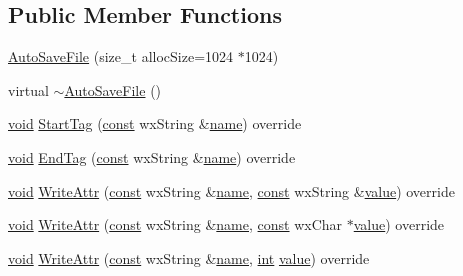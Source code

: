 \subsection*{Public Member Functions}
\begin{DoxyCompactItemize}
\item 
\hyperlink{class_auto_save_file_a1191340cd1c9edf6f5e107e68d35fcd7}{Auto\+Save\+File} (size\+\_\+t alloc\+Size=1024 $\ast$1024)
\item 
virtual \hyperlink{class_auto_save_file_ada283d82583fde5c8f0e92031097a40a}{$\sim$\+Auto\+Save\+File} ()
\item 
\hyperlink{sound_8c_ae35f5844602719cf66324f4de2a658b3}{void} \hyperlink{class_auto_save_file_ad97e8a57861d6dd0fc7bd6652f926f47}{Start\+Tag} (\hyperlink{getopt1_8c_a2c212835823e3c54a8ab6d95c652660e}{const} wx\+String \&\hyperlink{lib_2expat_8h_a1b49b495b59f9e73205b69ad1a2965b0}{name}) override
\item 
\hyperlink{sound_8c_ae35f5844602719cf66324f4de2a658b3}{void} \hyperlink{class_auto_save_file_a4c2452d96a12088eda5793943418d7d2}{End\+Tag} (\hyperlink{getopt1_8c_a2c212835823e3c54a8ab6d95c652660e}{const} wx\+String \&\hyperlink{lib_2expat_8h_a1b49b495b59f9e73205b69ad1a2965b0}{name}) override
\item 
\hyperlink{sound_8c_ae35f5844602719cf66324f4de2a658b3}{void} \hyperlink{class_auto_save_file_a9a82da10b4c3f8a7e67eab27233f28f9}{Write\+Attr} (\hyperlink{getopt1_8c_a2c212835823e3c54a8ab6d95c652660e}{const} wx\+String \&\hyperlink{lib_2expat_8h_a1b49b495b59f9e73205b69ad1a2965b0}{name}, \hyperlink{getopt1_8c_a2c212835823e3c54a8ab6d95c652660e}{const} wx\+String \&\hyperlink{lib_2expat_8h_a4a30a13b813682e68c5b689b45c65971}{value}) override
\item 
\hyperlink{sound_8c_ae35f5844602719cf66324f4de2a658b3}{void} \hyperlink{class_auto_save_file_a3f4b824a2a1fb8e5981bffdfd477a006}{Write\+Attr} (\hyperlink{getopt1_8c_a2c212835823e3c54a8ab6d95c652660e}{const} wx\+String \&\hyperlink{lib_2expat_8h_a1b49b495b59f9e73205b69ad1a2965b0}{name}, \hyperlink{getopt1_8c_a2c212835823e3c54a8ab6d95c652660e}{const} wx\+Char $\ast$\hyperlink{lib_2expat_8h_a4a30a13b813682e68c5b689b45c65971}{value}) override
\item 
\hyperlink{sound_8c_ae35f5844602719cf66324f4de2a658b3}{void} \hyperlink{class_auto_save_file_a8150c6559a3af90b2ea9371811110106}{Write\+Attr} (\hyperlink{getopt1_8c_a2c212835823e3c54a8ab6d95c652660e}{const} wx\+String \&\hyperlink{lib_2expat_8h_a1b49b495b59f9e73205b69ad1a2965b0}{name}, \hyperlink{xmltok_8h_a5a0d4a5641ce434f1d23533f2b2e6653}{int} \hyperlink{lib_2expat_8h_a4a30a13b813682e68c5b689b45c65971}{value}) override

\end{DoxyCompactItemize}

